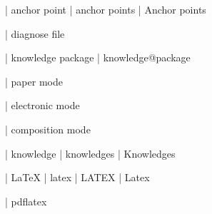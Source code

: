 %
%
%
%
 | anchor point
 | anchor points
 | Anchor points

 | diagnose file

 | knowledge package
 | knowledge@package

 | paper mode

 | electronic mode

 | composition mode

 | knowledge
 | knowledges
 | Knowledges

 | LaTeX
 | latex
 | LATEX
 | Latex

  | pdflatex